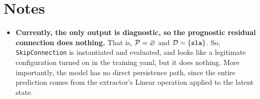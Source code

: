 \documentclass[11pt,landscape]{article}
\begin{document}
\clearpage

\section*{Notes}

\begin{minipage}{0.86\textwidth}
\small\sloppy
\begin{itemize}[leftmargin=1.1em]\setlength{\itemsep}{0.6em}

    \item \textbf{Currently, the only output is diagnostic, so the prognostic
        residual connection does nothing.}
      That is, $\mathcal{P} = \varnothing$
      and $\mathcal{D} = \{\text{\tt sla}\}$.
      So, \texttt{SkipConnection} is instantiated and evaluated, and looks like
      a legitimate configuration turned on in the training yaml, but it does
      nothing.
      More importantly, the model has no direct persistence path, since the entire prediction
      comes from the extractor's Linear operation applied to the latent state.


\end{itemize}
\end{minipage}
\end{document}

